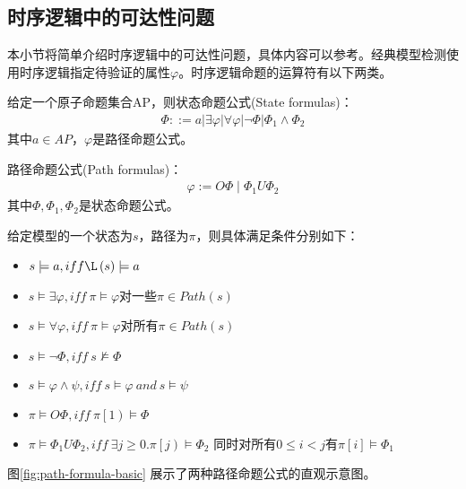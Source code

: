 \subsection{时序逻辑中的可达性问题}
本小节将简单介绍时序逻辑中的可达性问题，具体内容可以参考\citep{goranko_2023}。经典模型检测使用时序逻辑指定待验证的属性\(\varphi\)。时序逻辑命题的运算符有以下两类。
\begin{definition}\citep{goranko_2023}
    给定一个原子命题集合AP，则状态命题公式(State formulas)：
    \begin{align}
        \Phi::=a|\exists \varphi| \forall \varphi|\neg \Phi| \Phi_{1} \wedge \Phi_{2}
    \end{align}
    其中\(a\in AP\)，\(\varphi\)是路径命题公式。

    路径命题公式(Path formulas)：
    \begin{align}
        \varphi:=O \Phi \mid \Phi_{1} U \Phi_{2}
    \end{align}
    其中\(\Phi,\Phi_{1},\Phi_{2}\)是状态命题公式。
\end{definition}
给定模型的一个状态为\(s\)，路径为\(\pi\)，则具体满足条件分别如下：
\begin{itemize}
    \item \(s\models a,iff \L\left(s\right)\models a\)
    \item \(s\models\exists\varphi,iff\ \pi\models\varphi\)对一些\(\pi\in Path\left(s\right)\)
    \item \(s\models\forall\varphi,iff\ \pi\models\varphi\)对所有\(π\in Path(s)\)
    \item \(s\models\lnot\Phi,iff\ s\nvDash\Phi\)
    \item \(s\models\varphi\land\psi,iff\ s\models\varphi\ and\ s\models\psi\)
    \item \(\pi\models O\Phi,iff\ \pi\left[1\right)\models\Phi\)
    \item \(\pi\models\Phi_1 U\Phi_2,iff\ \exists j\geq0\).\(\pi\left[j\right)\models\Phi_2\) 同时对所有\(0\le i<j\)有\(\pi\left[i\right]\models\Phi_1\)
\end{itemize}


图\ref{fig:path-formula-basic} 展示了两种路径命题公式的直观示意图。


